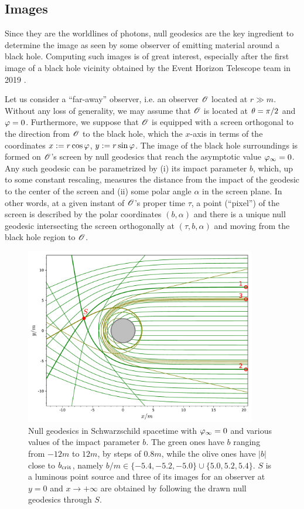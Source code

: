\subsection{Images}

Since they are the worldlines of photons, null geodesics are the key ingredient to
determine the image as seen by some observer of emitting material around
a black hole. Computing such images is of great interest, especially after
the first image of a black hole vicinity obtained by
the Event Horizon Telescope team in 2019 \cite{EHT19a,Cardo19}.

Let us consider a ``far-away'' observer, i.e. an observer $\mathscr{O}$ located at $r\gg m$. Without
any loss of generality, we may assume that $\mathscr{O}$ is located at $\theta=\pi/2$ and $\varphi=0$.
Furthermore, we suppose that $\mathscr{O}$ is
equipped with a screen orthogonal to the direction from $\mathscr{O}$ to the black hole, which
the $x$-axis in terms of the coordinates $x:=r\cos\varphi$, $y:=r\sin\varphi$.
The image of the black hole surroundings is formed on $\mathscr{O}$'s screen by null geodesics
that reach the asymptotic value $\varphi_\infty = 0$. Any such geodesic can be parametrized by
(i) its impact parameter $b$, which, up to some constant rescaling, measures the distance from
the impact of the geodesic to the center of the screen and (ii) some polar angle $\alpha$ in the screen plane.
In other words,
at a given instant of $\mathscr{O}$'s proper time $\tau$, a point (``pixel'') of the screen is
described by the polar coordinates $(b,\alpha)$ and there is a unique null geodesic intersecting
the screen orthogonally at $(\tau,b,\alpha)$ and moving from the black hole region to $\mathscr{O}$.

\begin{figure}
\centerline{\includegraphics[width=0.9\textwidth]{ges_mult_images.pdf}}
\caption[]{\label{f:ges:mult_images} \footnotesize
Null geodesics in Schwarzschild spacetime with $\varphi_\infty=0$ and various values of the impact parameter $b$.
The green ones have $b$ ranging from $-12 m$ to $12 m$, by steps of
$0.8 m$, while the olive ones have $|b|$ close to $b_{\rm crit}$,
namely $b/m\in\{-5.4,-5.2,-5.0\} \cup \{5.0, 5.2, 5.4\}$. $S$ is a luminous point source
and three of its images for an observer at $y=0$ and $x\to + \infty$ are obtained by
following the drawn null geodesics through $S$.}
\end{figure}

